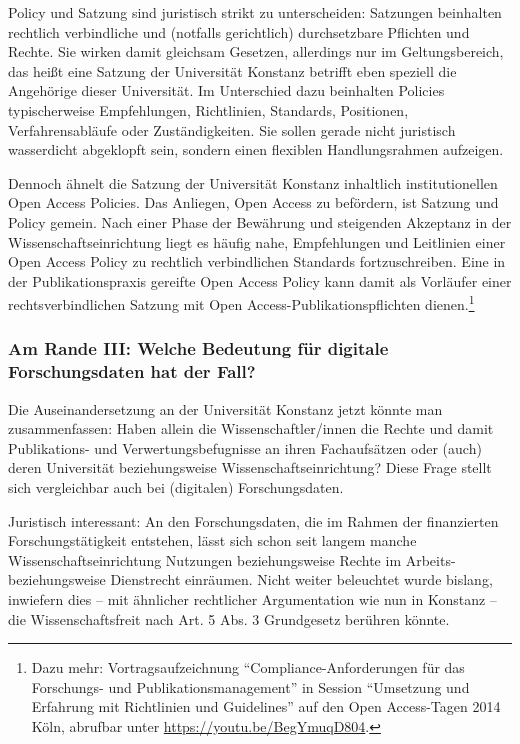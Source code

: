 \documentclass[a4paper,
fontsize=11pt,
oneside,
numbers=noperiodatend,
parskip=half-,
bibliography=totoc,
final
]{scrartcl}
\begin{document}
Policy und Satzung sind juristisch strikt zu unterscheiden: Satzungen
beinhalten rechtlich verbindliche und (notfalls gerichtlich)
durchsetzbare Pflichten und Rechte. Sie wirken damit gleichsam Gesetzen,
allerdings nur im Geltungsbereich, das heißt eine Satzung der
Universität Konstanz betrifft eben speziell die Angehörige dieser
Universität. Im Unterschied dazu beinhalten Policies typischerweise
Empfehlungen, Richtlinien, Standards, Positionen, Verfahrensabläufe oder
Zuständigkeiten. Sie sollen gerade nicht juristisch wasserdicht
abgeklopft sein, sondern einen flexiblen Handlungsrahmen aufzeigen.

Dennoch ähnelt die Satzung der Universität Konstanz inhaltlich
institutionellen Open Access Policies. Das Anliegen, Open Access zu
befördern, ist Satzung und Policy gemein. Nach einer Phase der Bewährung
und steigenden Akzeptanz in der Wissenschaftseinrichtung liegt es häufig
nahe, Empfehlungen und Leitlinien einer Open Access Policy zu rechtlich
verbindlichen Standards fortzuschreiben. Eine in der Publikationspraxis
gereifte Open Access Policy kann damit als Vorläufer einer
rechtsverbindlichen Satzung mit Open Access-Publikationspflichten
dienen.\footnote{Dazu mehr: Vortragsaufzeichnung
  \enquote{Compliance-Anforderungen für das Forschungs- und
  Publikationsmanagement} in Session \enquote{Umsetzung und Erfahrung
  mit Richtlinien und Guidelines} auf den Open Access-Tagen 2014 Köln,
  abrufbar unter \url{https://youtu.be/BegYmuqD804}.}

\hypertarget{am-rande-iii-welche-bedeutung-fuxfcr-digitale-forschungsdaten-hat-der-fall}{%
\subsubsection{Am Rande III: Welche Bedeutung für digitale
Forschungsdaten hat der
Fall?}\label{am-rande-iii-welche-bedeutung-fuxfcr-digitale-forschungsdaten-hat-der-fall}}

Die Auseinandersetzung an der Universität Konstanz jetzt könnte man
zusammenfassen: Haben allein die Wissenschaftler/innen die Rechte und
damit Publikations- und Verwertungsbefugnisse an ihren Fachaufsätzen
oder (auch) deren Universität beziehungsweise Wissenschaftseinrichtung?
Diese Frage stellt sich vergleichbar auch bei (digitalen)
Forschungsdaten.

Juristisch interessant: An den Forschungsdaten, die im Rahmen der
finanzierten Forschungstätigkeit entstehen, lässt sich schon seit langem
manche Wissenschaftseinrichtung Nutzungen beziehungsweise Rechte im
Arbeits- beziehungsweise Dienstrecht einräumen. Nicht weiter beleuchtet
wurde bislang, inwiefern dies -- mit ähnlicher rechtlicher Argumentation
wie nun in Konstanz -- die Wissenschaftsfreit nach Art. 5 Abs. 3
Grundgesetz berühren könnte.

\end{document}
